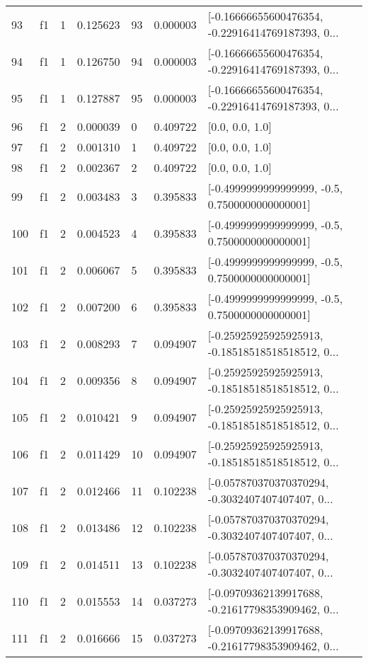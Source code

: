 \begin{tabular}{lllrlrl}
93  &  f1 &   1 &  0.125623 &   93 &  0.000003 &  [-0.16666655600476354, -0.22916414769187393, 0... \\
94  &  f1 &   1 &  0.126750 &   94 &  0.000003 &  [-0.16666655600476354, -0.22916414769187393, 0... \\
95  &  f1 &   1 &  0.127887 &   95 &  0.000003 &  [-0.16666655600476354, -0.22916414769187393, 0... \\
96  &  f1 &   2 &  0.000039 &    0 &  0.409722 &                                    [0.0, 0.0, 1.0] \\
97  &  f1 &   2 &  0.001310 &    1 &  0.409722 &                                    [0.0, 0.0, 1.0] \\
98  &  f1 &   2 &  0.002367 &    2 &  0.409722 &                                    [0.0, 0.0, 1.0] \\
99  &  f1 &   2 &  0.003483 &    3 &  0.395833 &    [-0.4999999999999999, -0.5, 0.7500000000000001] \\
100 &  f1 &   2 &  0.004523 &    4 &  0.395833 &    [-0.4999999999999999, -0.5, 0.7500000000000001] \\
101 &  f1 &   2 &  0.006067 &    5 &  0.395833 &    [-0.4999999999999999, -0.5, 0.7500000000000001] \\
102 &  f1 &   2 &  0.007200 &    6 &  0.395833 &    [-0.4999999999999999, -0.5, 0.7500000000000001] \\
103 &  f1 &   2 &  0.008293 &    7 &  0.094907 &  [-0.25925925925925913, -0.18518518518518512, 0... \\
104 &  f1 &   2 &  0.009356 &    8 &  0.094907 &  [-0.25925925925925913, -0.18518518518518512, 0... \\
105 &  f1 &   2 &  0.010421 &    9 &  0.094907 &  [-0.25925925925925913, -0.18518518518518512, 0... \\
106 &  f1 &   2 &  0.011429 &   10 &  0.094907 &  [-0.25925925925925913, -0.18518518518518512, 0... \\
107 &  f1 &   2 &  0.012466 &   11 &  0.102238 &  [-0.057870370370370294, -0.3032407407407407, 0... \\
108 &  f1 &   2 &  0.013486 &   12 &  0.102238 &  [-0.057870370370370294, -0.3032407407407407, 0... \\
109 &  f1 &   2 &  0.014511 &   13 &  0.102238 &  [-0.057870370370370294, -0.3032407407407407, 0... \\
110 &  f1 &   2 &  0.015553 &   14 &  0.037273 &  [-0.09709362139917688, -0.21617798353909462, 0... \\
111 &  f1 &   2 &  0.016666 &   15 &  0.037273 &  [-0.09709362139917688, -0.21617798353909462, 0... \\

\end{tabular}
